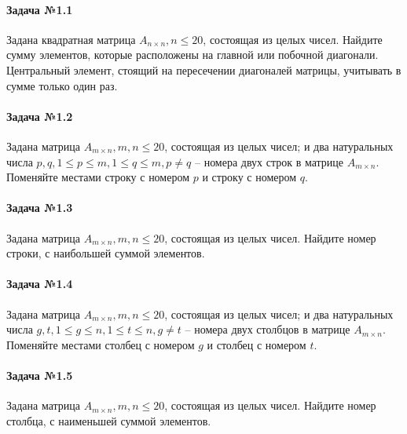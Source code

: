\documentclass[12pt,a4paper]{report}
\begin{document}
\parindent=1cm
\pagestyle{empty}




\clearpage
\paragraph*{Задача №1.1}
Задана квадратная матрица $A_{n \times n}, n \le 20$, состоящая из целых чисел. Найдите сумму элементов, которые расположены на главной или побочной диагонали. Центральный элемент, стоящий на пересечении диагоналей матрицы, учитывать в сумме только один раз.

\paragraph*{Задача №1.2}
Задана матрица $A_{m \times n}, m, n \le 20$, состоящая из целых чисел; и два натуральных числа $p, q, 1 \le p \le m, 1 \le q \le m, p \ne q$ -- номера двух строк в матрице $A_{m \times n}$. Поменяйте местами строку с номером $p$ и строку с номером $q$.

\paragraph*{Задача №1.3}
Задана матрица $A_{m \times n}, m, n \le 20$, состоящая из целых чисел. Найдите номер строки, с наибольшей суммой элементов.

\paragraph*{Задача №1.4}
Задана матрица $A_{m \times n}, m, n \le 20$, состоящая из целых чисел; и два натуральных числа $g, t, 1 \le g \le n, 1 \le t \le n, g \ne t$ -- номера двух столбцов в матрице $A_{m \times n}$. Поменяйте местами столбец с номером $g$ и столбец с номером $t$.

\paragraph*{Задача №1.5}
Задана матрица $A_{m \times n}, m, n \le 20$, состоящая из целых чисел. Найдите номер столбца, с наименьшей суммой элементов.
\end{document}
